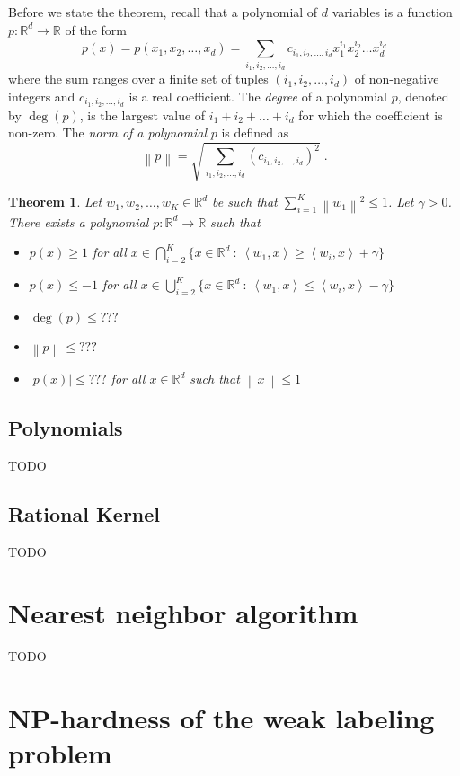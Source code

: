 \documentclass[12pt]{article}
\newtheorem{theorem}[definition]{Theorem}
\newcommand{\R}{\mathbb{R}}  %
\newcommand{\ip}[2]{\left\langle #1, #2 \right\rangle} %
\newcommand{\norm}[1]{\left\| #1 \right\|}  %
\begin{document}
Before we state the theorem, recall that a polynomial of $d$ variables is a
function $p:\R^d \to \R$ of the form
$$
p(x) = p(x_1, x_2, \dots, x_d) = \sum_{i_1, i_2, \dots, i_d} c_{i_1, i_2, \dots, i_d} x_1^{i_1} x_2^{i_2} \dots x_d^{i_d}
$$
where the sum ranges over a finite set of tuples $(i_1, i_2, \dots, i_d)$ of
non-negative integers and $c_{i_1, i_2, \dots, i_d}$ is a real coefficient. The
\emph{degree} of a polynomial $p$, denoted by $\deg(p)$, is the largest value of
$i_1 + i_2 + \dots + i_d$ for which the coefficient is non-zero. The \emph{norm
of a polynomial} $p$ is defined as
$$
\norm{p} = \sqrt{\sum_{i_1, i_2, \dots, i_d} \left(c_{i_1, i_2, \dots, i_d} \right)^2 } \; .
$$

\begin{theorem}
\label{theorem:polynomial-approximation}
Let $w_1, w_2, \dots, w_K \in \R^d$ be such that $\sum_{i=1}^K \norm{w_1}^2 \le 1$.
Let $\gamma > 0$. There exists a polynomial $p:\R^d \to \R$ such that
\begin{itemize}
\item $p(x) \ge 1$ for all $x \in \bigcap_{i=2}^K \{ x \in \R^d ~:~ \ip{w_1}{x} \ge \ip{w_i}{x} + \gamma \}$
\item $p(x) \le -1$ for all $x \in \bigcup_{i=2}^K \{ x \in \R^d ~:~ \ip{w_1}{x} \le \ip{w_i}{x} - \gamma \}$
\item $\deg(p) \le ???$
\item $\norm{p} \le ???$
\item $|p(x)| \le ???$ for all $x \in \R^d$ such that $\norm{x} \le 1$
\end{itemize}
\end{theorem}

\subsection{Polynomials}
TODO

\subsection{Rational Kernel}
TODO

\section{Nearest neighbor algorithm}

TODO


\section{NP-hardness of the weak labeling problem}
\end{document}
